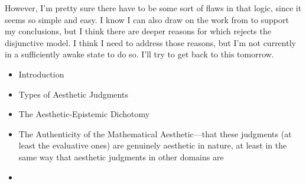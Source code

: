 \documentclass[a4paper,man,natbib]{apa6}
\begin{document}
However, I'm pretty sure there have to be some sort of flaws in that logic, since it seems so simple and easy. I know
I can also draw on the work from \cite{inglis_beauty_2015} to support my conclusions, but I think there are deeper
reasons for which \cite{todd_unmasking_2008} rejects the disjunctive model. I think I need to address those reasons,
but I'm not currently in a sufficiently awake state to do so. I'll try to get back to this tomorrow.

\begin{itemize}
      \item Introduction
      \item Types of Aesthetic Judgments
      \item The Aesthetic-Epistemic Dichotomy

      \item The Authenticity of the Mathematical Aesthetic---that these judgments (at least the evaluative ones) are
      genuinely aesthetic in nature, at least in the same way that aesthetic judgments in other domains are
      \item 
\end{itemize}



\end{document}
